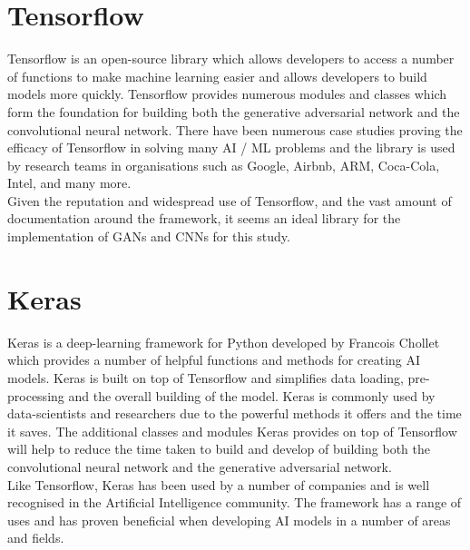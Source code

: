 \section{Tensorflow}
Tensorflow is an open-source library which allows developers to access a number of functions to make machine learning easier and allows developers to build models more quickly\cite{tensorflow}.  Tensorflow provides numerous modules and classes which form the foundation for building both the generative adversarial network and the convolutional neural network. There have been numerous case studies proving the efficacy of Tensorflow in solving many AI / ML problems and the library is used by research teams in organisations such as Google, Airbnb, ARM, Coca-Cola, Intel, and many more\cite{tensorflowCaseStudies}.  
\\
Given the reputation and widespread use of Tensorflow, and the vast amount of documentation around the framework, it seems  an ideal library for the implementation of GANs and CNNs for this study.
\section{Keras}
Keras is a deep-learning framework for Python developed by Francois Chollet which provides a number of helpful functions and methods for creating AI models\cite{keras}. Keras is built on top of Tensorflow and simplifies data loading, pre-processing and the overall building of the model.  Keras is commonly used by data-scientists and researchers due to the powerful methods it offers and the time it saves.  The additional classes and modules Keras provides on top of Tensorflow will help to reduce the time taken to build and develop of building both the convolutional neural network and the generative adversarial network.  
\\
Like Tensorflow, Keras has been used by a number of companies and is well recognised in the Artificial Intelligence community.  The framework has a range of uses and has proven beneficial when developing AI models in a number of areas and fields\cite{kerasExamples}.
